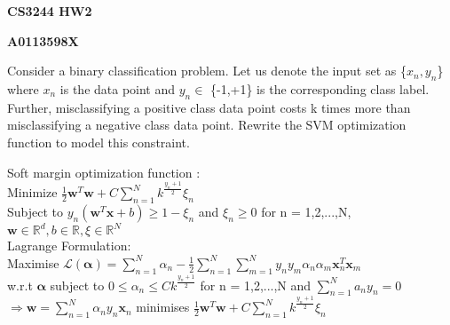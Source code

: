 \documentclass[11pt,a4paper,answers]{exam}
\providecommand{\nline}{\vspace*{.5cm}}
\begin{document}
\begin{center}
{\bf CS3244 HW2}

{\bf A0113598X}
\end{center}

\nline

\begin{questions}
	\question
	Consider a binary classification problem. Let us denote the input set as \{$x_{n}, y_{n}$\} where $x_{n}$ is the data point and $y_{n} \in$ \{-1,+1\} is the corresponding class label. Further, misclassifying a positive class data point costs k times more than misclassifying a negative class data point. Rewrite the SVM optimization function to model this constraint.
	\begin{solution}
		Soft margin optimization function :\\
		Minimize $\frac{1}{2}\mathbf{w}^{T}\mathbf{w} + C \sum_{n=1}^{N}k^{\frac{y_{n} + 1}{2}}\xi _{n}$ \\
		Subject to $y_{n}(\mathbf{w}^{T}\mathbf{x} + b) \geq 1 - \xi_{n}$ and $\xi_{n} \geq 0$ for n = 1,2,...,N,
		$\mathbf{w} \in \mathbb{R}^{d}, b \in \mathbb{R}, \xi \in \mathbb{R}^{N}$ \\
		Lagrange Formulation:\\
		Maximise $ \mathcal{L}(\mathbf{\alpha}) = \sum_{n=1}^{N}\alpha_{n} - \frac{1}{2}\sum_{n=1}^{N}\sum_{m=1}^{N}y_{n}y_{m}\alpha_{n}\alpha_{m}\mathbf{x}_{n}^{T}\mathbf{x}_{m}$\\
		w.r.t $\mathbf{\alpha} $
		subject to $0 \leq \alpha_{n} \leq C k^{\frac{y_{n} + 1}{2}}$ for n = 1,2,...,N and $\sum_{n=1}^{N}a_{n}y_{n} = 0$ \\
		$\Rightarrow \mathbf{w} =\sum_{n=1}^{N}\alpha_{n}y_{n}\mathbf{x}_{n} $ minimises $\frac{1}{2}\mathbf{w}^{T}\mathbf{w} + C \sum_{n=1}^{N}k^{\frac{y_{n} + 1}{2}}\xi _{n}$
	\end{solution}
	

\end{questions}
\end{document}
